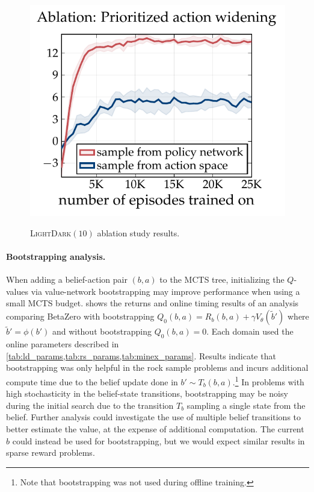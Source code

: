 \begin{figure}[t]
{        \includegraphics{figures/betazero/ablations/plot_ablation_action_selection.pdf}
    }

    \caption{\textsc{LightDark}$(10)$ ablation study results.}
    \label{fig:ablations}
\end{figure}


\paragraph{Bootstrapping analysis.}
When adding a belief-action pair $(b,a)$ to the MCTS tree, initializing the $Q$-values via value-network bootstrapping may improve performance when using a small MCTS budget.
 shows the returns and online timing results of an analysis comparing BetaZero with bootstrapping $Q_0(b,a) = R_b(b,a) + \gamma V_\theta(\tilde{b}')$ where $\tilde{b}' = \phi(b')$ and without bootstrapping $Q_0(b,a)=0$.
Each domain used the online parameters described in \cref{tab:ld_params,tab:rs_params,tab:minex_params}.
Results indicate that bootstrapping was only helpful in the rock sample problems and incurs additional compute time due to the belief update done in $b' \sim T_b(b,a)$.\footnote{Note that bootstrapping was not used during offline training.}
In problems with high stochasticity in the belief-state transitions, bootstrapping may be noisy during the initial search due to the transition $T_b$ sampling a single state from the belief.
Further analysis could investigate the use of multiple belief transitions to better estimate the value, at the expense of additional computation.
The current $b$ could instead be used for bootstrapping, but we would expect similar results in sparse reward problems.


